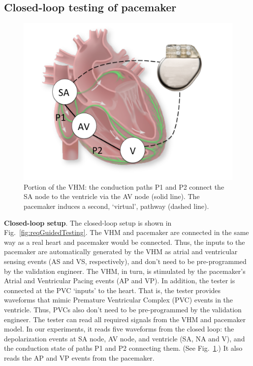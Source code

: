 \subsection{Closed-loop testing of pacemaker}
\label{closedloop}

\begin{figure}[t]
\centering
\includegraphics[scale=0.2]{figures/nodesandPM}
\caption{Portion of the VHM: the conduction paths P1 and P2 connect the SA node to the ventricle via the AV node (solid line). The pacemaker induces a second, `virtual', pathway (dashed line).}
\label{fig:nodesandPM}
\end{figure}

\textbf{Closed-loop setup}.
The closed-loop setup is shown in Fig.~\ref{fig:reqGuidedTesting}.
The VHM and pacemaker are connected in the same way as a real heart and pacemaker would be connected.
Thus, the inputs to the pacemaker are automatically generated by the VHM as atrial and ventricular sensing events (AS and VS, respectively), and don't need to be pre-programmed by the validation engineer. 
The VHM, in turn, is stimulated by the pacemaker's Atrial and Ventricular Pacing events (AP and VP).
In addition, the tester is connected at the PVC `inputs' to the heart.
That is, the tester provides waveforms that mimic Premature Ventricular Complex (PVC) events in the ventricle.
Thus, PVCs also don't need to be pre-programmed by the validation engineer.
The tester can read all required signals from the VHM and pacemaker model.
In our experiments, it reads five waveforms from the closed loop: the depolarization events at SA node, AV node, and ventricle (SA, NA and V), and the conduction state of paths P1 and P2 connecting them. (See Fig.~\ref{fig:nodesandPM}.)
It also reads the AP and VP events from the pacemaker.


